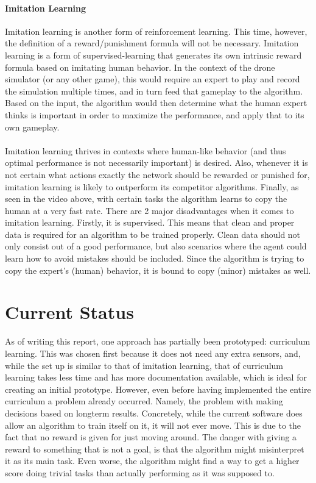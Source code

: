 \paragraph{Imitation Learning}
Imitation learning is another form of reinforcement learning. This time, however, the definition of a reward/punishment formula will not be necessary. Imitation learning is a form of supervised-learning that generates its own intrinsic reward formula based on imitating human behavior. In the context of the drone simulator (or any other game), this would require an expert to play and record the simulation multiple times, and in turn feed that gameplay to the algorithm. Based on the input, the algorithm would then determine what the human expert thinks is important in order to maximize the performance, and apply that to its own gameplay.
\\\\
Imitation learning thrives in contexts where human-like behavior (and thus optimal performance is not necessarily important) is desired. Also, whenever it is not certain what actions exactly the network should be rewarded or punished for, imitation learning is likely to outperform its competitor algorithms. Finally, as seen in the video above, with certain tasks the algorithm learns to copy the human at a very fast rate.
\pagebreak
\noindent
There are 2 major disadvantages when it comes to imitation learning. Firstly, it is supervised. This means that clean and proper data is required for an algorithm to be trained properly. Clean data should not only consist out of a good performance, but also scenarios where the agent could learn how to avoid mistakes should be included. Since the algorithm is trying to copy the expert's (human) behavior, it is bound to copy (minor) mistakes as well.

\section{Current Status}
\label{sec:collision_avoidance_status}
As of writing this report, one approach has partially been prototyped: curriculum learning. This was chosen first because it does not need any extra sensors, and, while the set up is similar to that of imitation learning, that of curriculum learning takes less time and has more documentation available, which is ideal for creating an initial prototype. However, even before having implemented the entire curriculum a problem already occurred. Namely, the problem with making decisions based on longterm results. Concretely, while the current software does allow an algorithm to train itself on it, it will not ever move. This is due to the fact that no reward is given for just moving around. The danger with giving a reward to something that is not a goal, is that the algorithm might misinterpret it as its main task. Even worse, the algorithm might find a way to get a higher score doing trivial tasks than actually performing as it was supposed to.  

